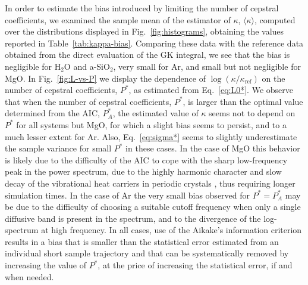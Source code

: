 In order to estimate the bias introduced by limiting the number of cepstral coefficients, we examined the sample mean of the estimator of $\kappa$, $\langle\kappa\rangle$, computed over the distributions displayed in Fig.~\ref{fig:histograms}, obtaining the values reported in Table~\ref{tab:kappa-bias}. Comparing these data with the reference data obtained from  the direct evaluation of the GK integral, we see that the bias is negligible for H$_2$O and a-SiO$_2$, very small for Ar, and small but not negligible for MgO. In Fig.~\ref{fig:L-vs-P} we display the dependence of $\log(\kappa/\kappa_{\mathrm{ref}})$ on the number of cepstral coefficients, $P^*$, as estimated from Eq.~\eqref{eq:L0*}. We observe that when the number of cepstral coefficients, $P^*$, is larger than the optimal value determined from the AIC, $P_A^*$, the estimated value of $\kappa$ seems not to depend on $P^*$ for all systems but MgO, for which a slight bias seems to persist, and to a much lesser extent for Ar. Also, Eq.~\eqref{eq:sigma*} seems to slightly underestimate the sample variance for small $P^*$ in these cases. In the case of MgO this behavior is likely due to the difficulty of the AIC to cope with the sharp low-frequency peak in the power spectrum, due to the highly harmonic character and slow decay of the vibrational heat carriers in periodic crystals \cite{Carbogno:2017gc}, thus requiring longer simulation times. In the case of Ar the very small bias observed for $P^* =P^*_A$ may be due to the difficulty of choosing a suitable cutoff frequency when only a single diffusive band is present in the spectrum, and to the divergence of the log-spectrum at high frequency. In all cases, use of the Aikake's information criterion results in a bias that is smaller than the statistical error estimated from an individual short sample trajectory and that can be systematically removed by increasing the value of $P^*$, at the price of increasing the statistical error, if and when needed.



